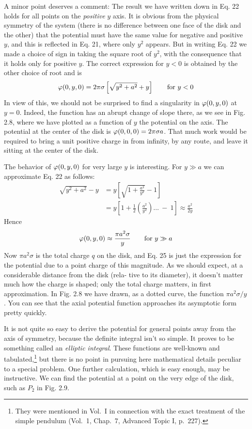 A minor point deserves a comment: The result we have written
down in Eq. 22 holds for all points on the \emph{positive} $y$ axis. It is obvious
from the physical symmetry of the system (there is no difference between
one face of the disk and the other) that the potential must have
the same value for negative and positive $y$, and this is reflected in
Eq. 21, where only $y^2$ appears. But in writing Eq. 22 we made a
choice of sign in taking the square root of $y^2$, with the consequence
that it holds only for positive $y$. The correct expression for $y < 0$ is
obtained by the other choice of root and is
\begin{equation}
  \varphi(0,y,0) = 2\pi\sigma\left[\sqrt{y^2+a^2}+y\right] \qquad \text{for $y<0$}
\end{equation}
In view of this, we should not be surprised to find a singularity in
$\varphi(0,y,0)$ at $y = 0$. Indeed, the function has an abrupt change of
slope there, as we see in Fig. 2.8, where we have plotted as a function
of $y$ the potential on the axis. The potential at the center of the disk
is $\varphi(0,0,0) = 2\pi\sigma a$. That much work would be required to bring a
unit positive charge in from infinity, by any route, and leave it sitting
at the center of the disk.

The behavior of $\varphi(0,y,0)$ for very large $y$ is interesting. For $y \gg a$
we can approximate Eq. 22 as follows:
\begin{align}
  \sqrt{y^2+a^2} - y &= y \left[\sqrt{1+\frac{a^2}{y^2}}-1\right] \\
                     &= y \left[1+\frac{1}{2}\left(\frac{a^2}{y^2}\right)\ldots\:-\:1\right]
                                 \approx \frac{a^2}{2y}
\end{align}
Hence
\begin{equation}
  \varphi(0,y,0)\approx \frac{\pi a^2\sigma}{y} \qquad \text{for $y \gg a$}
\end{equation}
Now $\pi a^2\sigma$ is the total charge $q$ on the disk, and Eq. 25 is just the expression
for the potential due to a point charge of this magnitude.
As we should expect, at a considerable distance from the disk (rela-
tive to its diameter), it doesn't matter much how the charge is shaped;
only the total charge matters, in first approximation. In Fig. 2.8 we
have drawn, as a dotted curve, the function $\pi a^2\sigma/y$. You can see that
the axial potential function approaches its asymptotic form pretty
quickly.

It is not quite so easy to derive the potential for general points
away from the axis of symmetry, because the definite integral isn't so
simple. It proves to be something called an \emph{elliptic integral}. These
functions are well-known and 
tabulated,\footnote{They were mentioned in Vol.~I in connection with the exact treatment of the simple
pendulum (Vol.~1, Chap.~7, Advanced Topic I, p.~227).} but there is no point in
pursuing here mathematical details peculiar to a special problem.
One further calculation, which is easy enough, may be instructive.
We can find the potential at a point on the very edge of the disk, such
as $P_2$ in Fig. 2.9.

